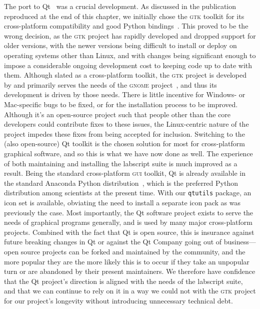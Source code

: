 The port to Qt~\cite{the_qt_company_qt_2018} was a crucial development. As discussed in the publication reproduced at the end of this chapter, we initially chose the \textsc{gtk} toolkit for its cross-platform compatibility and good Python bindings~\cite{riverbank_computing_pyqt_2018}. This proved to be the wrong decision, as the \textsc{gtk} project has rapidly developed and dropped support for older versions, with the newer versions being difficult to install or deploy on operating systems other than Linux, and with changes being significant enough to impose a considerable ongoing development cost to keeping code up to date with them. Although slated as a cross-platform toolkit, the \textsc{gtk} project is developed by and primarily serves the needs of the \textsc{gnome} project~\cite{the_gnome_project_gnome_2018}, and thus its development is driven by those needs. There is little incentive for Windows- or Mac-specific bugs to be fixed, or for the installation process to be improved. Although it's an open-source project such that people other than the core developers could contribute fixes to these issues, the Linux-centric nature of the project impedes these fixes from being accepted for inclusion. Switching to the (also open-source) Qt toolkit is the chosen solution for most for cross-platform graphical software, and so this is what we have now done as well. The experience of both maintaining and installing the labscript suite is much improved as a result. Being the standard cross-platform \textsc{gui} toolkit, Qt is already available in the standard Anaconda Python distribution~\cite{continuum_analytics_anaconda_2018}, which is the preferred Python distribution among scientists at the present time. With our \texttt{qtutils} package, an icon set is available, obviating the need to install a separate icon pack as was previously the case. Most importantly, the Qt software project exists to serve the needs of graphical programs generally, and is used by many major cross-platform projects. Combined with the fact that Qt is open source, this is insurance against future breaking changes in Qt or against the Qt Company going out of business---open source projects can be forked and maintained by the community, and the more popular they are the more likely this is to occur if they take an unpopular turn or are abandoned by their present maintainers. We therefore have confidence that the Qt project's direction is aligned with the needs of the labscript suite, and that we can continue to rely on it in a way we could not with the \textsc{gtk} project for our project's longevity without introducing unnecessary technical debt.


